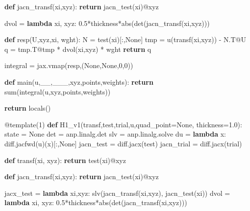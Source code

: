 \documentclass[
  11pt,
]{article}
\newenvironment{Shaded}{}{}
\newcommand{\AttributeTok}[1]{\textcolor[rgb]{0.49,0.56,0.16}{#1}}
\newcommand{\BuiltInTok}[1]{#1}
\newcommand{\ControlFlowTok}[1]{\textcolor[rgb]{0.00,0.44,0.13}{\textbf{#1}}}
\newcommand{\DecValTok}[1]{\textcolor[rgb]{0.25,0.63,0.44}{#1}}
\newcommand{\FloatTok}[1]{\textcolor[rgb]{0.25,0.63,0.44}{#1}}
\newcommand{\KeywordTok}[1]{\textcolor[rgb]{0.00,0.44,0.13}{\textbf{#1}}}
\newcommand{\NormalTok}[1]{#1}
\newcommand{\OperatorTok}[1]{\textcolor[rgb]{0.40,0.40,0.40}{#1}}
\newcommand{\VariableTok}[1]{\textcolor[rgb]{0.10,0.09,0.49}{#1}}
\begin{document}
\begin{Shaded}
\begin{Highlighting}[]
    \KeywordTok{def}\NormalTok{ jacn\_transf(xi,xyz):}
        \ControlFlowTok{return}\NormalTok{ jacn\_test(xi)}\OperatorTok{@}\NormalTok{xyz}

\NormalTok{    dvol }\OperatorTok{=} \KeywordTok{lambda}\NormalTok{ xi, xyz: }\FloatTok{0.5}\OperatorTok{*}\NormalTok{thickness}\OperatorTok{*}\BuiltInTok{abs}\NormalTok{(det(jacn\_transf(xi,xyz)))}
     
    \KeywordTok{def}\NormalTok{ resp(U,xyz,xi, wght):}
\NormalTok{        N }\OperatorTok{=}\NormalTok{ test(xi)[:,}\VariableTok{None}\NormalTok{]}
\NormalTok{        tmp }\OperatorTok{=}\NormalTok{ u(transf(xi,xyz)) }\OperatorTok{{-}}\NormalTok{ N.T}\OperatorTok{@}\NormalTok{U}
\NormalTok{        q }\OperatorTok{=}\NormalTok{  tmp.T}\OperatorTok{@}\NormalTok{tmp }\OperatorTok{*}\NormalTok{ dvol(xi,xyz) }\OperatorTok{*}\NormalTok{ wght}
        \ControlFlowTok{return}\NormalTok{ q}
    
\NormalTok{    integral }\OperatorTok{=}\NormalTok{ jax.vmap(resp,(}\VariableTok{None}\NormalTok{,}\VariableTok{None}\NormalTok{,}\DecValTok{0}\NormalTok{,}\DecValTok{0}\NormalTok{))}

    \KeywordTok{def}\NormalTok{ main(u,\_\_,\_\_\_,xyz,points,weights):}
        \ControlFlowTok{return} \BuiltInTok{sum}\NormalTok{(integral(u,xyz,points,weights))}
    
    \ControlFlowTok{return} \BuiltInTok{locals}\NormalTok{()}


\AttributeTok{@template}\NormalTok{(}\DecValTok{1}\NormalTok{)}
\KeywordTok{def}\NormalTok{ H1\_v1(transf,test,trial,u,quad\_point}\OperatorTok{=}\VariableTok{None}\NormalTok{, thickness}\OperatorTok{=}\FloatTok{1.0}\NormalTok{):}
\NormalTok{    state }\OperatorTok{=} \VariableTok{None}
\NormalTok{    det }\OperatorTok{=}\NormalTok{ anp.linalg.det}
\NormalTok{    slv }\OperatorTok{=}\NormalTok{ anp.linalg.solve}
\NormalTok{    du }\OperatorTok{=} \KeywordTok{lambda}\NormalTok{ x: diff.jacfwd(u)(x)[:,}\VariableTok{None}\NormalTok{]}
\NormalTok{    jacn\_test }\OperatorTok{=}\NormalTok{ diff.jacx(test)}
\NormalTok{    jacn\_trial }\OperatorTok{=}\NormalTok{ diff.jacx(trial)}

    \KeywordTok{def}\NormalTok{ transf(xi, xyz):}
        \ControlFlowTok{return}\NormalTok{ test(xi)}\OperatorTok{@}\NormalTok{xyz}
    
    \KeywordTok{def}\NormalTok{ jacn\_transf(xi,xyz):}
        \ControlFlowTok{return}\NormalTok{ jacn\_test(xi)}\OperatorTok{@}\NormalTok{xyz}

\NormalTok{    jacx\_test }\OperatorTok{=} \KeywordTok{lambda}\NormalTok{ xi,xyz: slv(jacn\_transf(xi,xyz), jacn\_test(xi))}
\NormalTok{    dvol }\OperatorTok{=} \KeywordTok{lambda}\NormalTok{ xi, xyz: }\FloatTok{0.5}\OperatorTok{*}\NormalTok{thickness}\OperatorTok{*}\BuiltInTok{abs}\NormalTok{(det(jacn\_transf(xi,xyz)))}
    

\end{Highlighting}
\end{Shaded}
\end{document}
